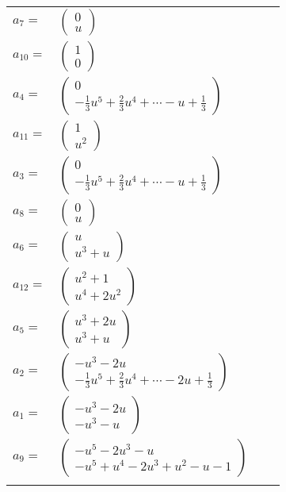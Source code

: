 \documentclass[1p]{elsarticle_modified}
\theoremstyle{definition}
\begin{document}
\begin{tabular}{m{7pt} m{180pt} m{7pt} m{180pt} }
\flushright $a_{7}=$&$\begin{pmatrix}0\\u\end{pmatrix}$ \\
\flushright $a_{10}=$&$\begin{pmatrix}1\\0\end{pmatrix}$ \\
\flushright $a_{4}=$&$\begin{pmatrix}0\\-\frac{1}{3} u^5+\frac{2}{3} u^4+\cdots- u+\frac{1}{3}\end{pmatrix}$ \\
\flushright $a_{11}=$&$\begin{pmatrix}1\\u^2\end{pmatrix}$ \\
\flushright $a_{3}=$&$\begin{pmatrix}0\\-\frac{1}{3} u^5+\frac{2}{3} u^4+\cdots- u+\frac{1}{3}\end{pmatrix}$ \\
\flushright $a_{8}=$&$\begin{pmatrix}0\\u\end{pmatrix}$ \\
\flushright $a_{6}=$&$\begin{pmatrix}u\\u^3+u\end{pmatrix}$ \\
\flushright $a_{12}=$&$\begin{pmatrix}u^2+1\\u^4+2 u^2\end{pmatrix}$ \\
\flushright $a_{5}=$&$\begin{pmatrix}u^3+2 u\\u^3+u\end{pmatrix}$ \\
\flushright $a_{2}=$&$\begin{pmatrix}- u^3-2 u\\-\frac{1}{3} u^5+\frac{2}{3} u^4+\cdots-2 u+\frac{1}{3}\end{pmatrix}$ \\
\flushright $a_{1}=$&$\begin{pmatrix}- u^3-2 u\\- u^3- u\end{pmatrix}$ \\
\flushright $a_{9}=$&$\begin{pmatrix}- u^5-2 u^3- u\\- u^5+u^4-2 u^3+u^2- u-1\end{pmatrix}$\\&\end{tabular}
\end{document}
